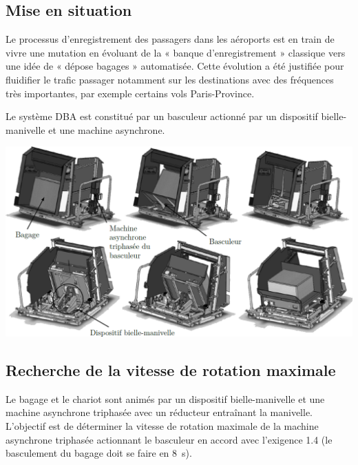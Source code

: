 \documentclass[10pt,fleqn]{article} %
\begin{document}

\vspace{4.5cm}
\pagestyle{fancy}
\thispagestyle{plain}


\def\columnseprulecolor{\color{ocre}}
\setlength{\columnseprule}{0.4pt} 

\ifprof
\begin{multicols}{2}
\else
\begin{multicols}{2}
\fi
\section*{Mise en situation}
\ifprof
\else
\fi

Le processus d’enregistrement des passagers dans les aéroports est en train de
vivre une mutation en évoluant de la « banque d’enregistrement » classique vers une idée de « dépose bagages »
automatisée. Cette évolution a été justifiée pour fluidifier le trafic passager notamment sur les destinations avec
des fréquences très importantes, par exemple certains vols Paris-Province.


Le système DBA est constitué par un basculeur actionné par un dispositif bielle-manivelle et une machine
asynchrone.


\begin{center}
\includegraphics[width=\linewidth]{images/fig_01}
\end{center}

\subsection*{Recherche de la vitesse de rotation maximale}
\begin{obj} 
Le bagage et le chariot sont animés par un dispositif bielle-manivelle et une machine asynchrone
triphasée avec un réducteur entraînant la manivelle. L’objectif est de déterminer la vitesse de rotation
maximale de la machine asynchrone triphasée actionnant le basculeur en accord avec l’exigence 1.4
(le basculement du bagage doit se faire en \SI{8}{s}).
\end{obj}


\end{multicols}
\end{multicols}
\end{document}
